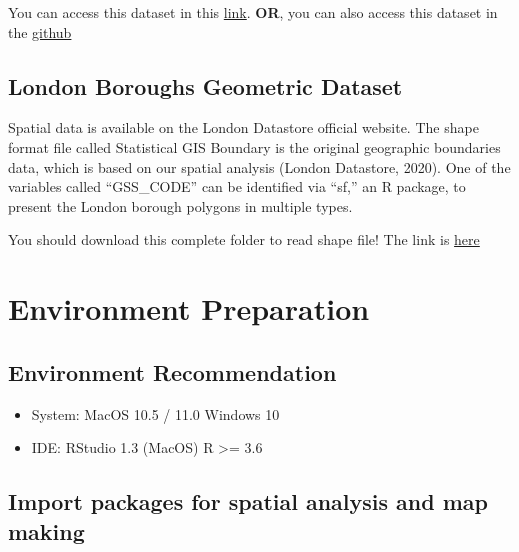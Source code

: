 \documentclass[
]{book}
\begin{document}
You can access this dataset in this \href{https://www.gov.uk/guidance/find-and-use-data-on-public-electric-vehicle-chargepoints\#accessing-data-on-ncv}{link}. \textbf{OR}, you can also access this dataset in the \href{https://raw.githubusercontent.com/Hereislittlemushroom/CASA0005_Final_Assessment/main/Dataset/national-charge-point-registry.csv}{github}

\hypertarget{london-boroughs-geometric-dataset}{%
\section{London Boroughs Geometric Dataset}\label{london-boroughs-geometric-dataset}}

Spatial data is available on the London Datastore official website. The shape format file called Statistical GIS Boundary is the original geographic boundaries data, which is based on our spatial analysis (London Datastore, 2020). One of the variables called ``GSS\_CODE'' can be identified via ``sf,'' an R package, to present the London borough polygons in multiple types.

You should download this complete folder to read shape file! The link is \href{https://github.com/Hereislittlemushroom/CASA0005_Final_Assessment/tree/main/Dataset/statistical-gis-boundaries-london}{here}

\hypertarget{environment-preparation}{%
\chapter{Environment Preparation}\label{environment-preparation}}

\hypertarget{environment-recommendation}{%
\section{Environment Recommendation}\label{environment-recommendation}}

\begin{itemize}
\item
  System: MacOS 10.5 / 11.0 Windows 10
\item
  IDE: RStudio 1.3 (MacOS) R \textgreater= 3.6
\end{itemize}

\hypertarget{import-packages-for-spatial-analysis-and-map-making}{%
\section{Import packages for spatial analysis and map making}\label{import-packages-for-spatial-analysis-and-map-making}}
\end{document}
